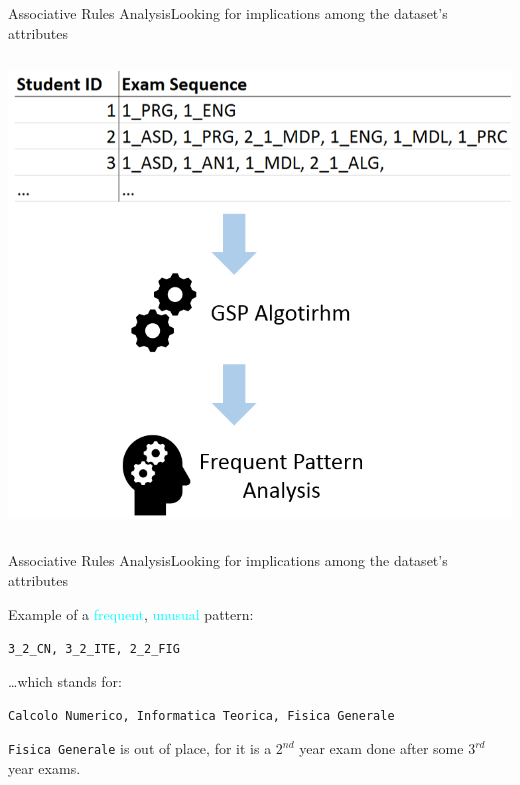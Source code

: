 \begin{frame}{Associative Rules Analysis}{Looking for implications among the dataset's attributes}
\begin{columns}
\begin{column}{0.5\textwidth}
    \hspace*{-0.5cm}\includegraphics[scale=0.21]{seq3.png}
\end{column}
\end{columns}

\end{frame}

\begin{frame}{Associative Rules Analysis}{Looking for implications among the dataset's attributes}

    \alert{Example} of a \textcolor{cyan}{frequent}, \textcolor{cyan}{unusual} pattern: \\

	\vspace{0.3cm}
	\begin{centering}
		\texttt{3\_2\_CN, 3\_2\_ITE, 2\_2\_FIG}\\
	\end{centering}
	\vspace{0.3cm}

	\ldots which stands for:

	\vspace{0.3cm}
	\begin{centering}
	\texttt{Calcolo Numerico, Informatica Teorica, Fisica Generale}\\
	\end{centering}
	\vspace{0.6cm}

	\texttt{Fisica Generale} is \alert{out of place}, for it is a $2^{nd}$ year exam done after some $3^{rd}$ year exams.\\

\end{frame}

